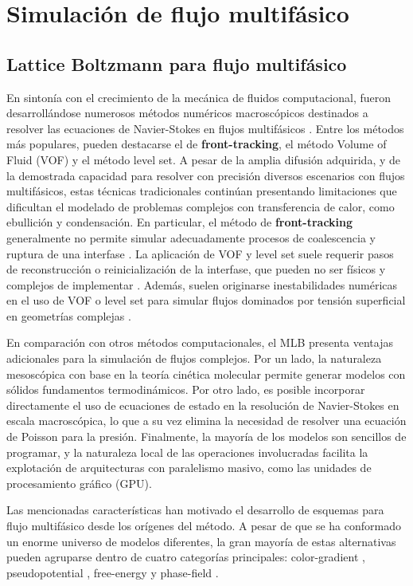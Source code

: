 \chapter{Simulaci\'on de flujo multif\'asico}

\section{Lattice Boltzmann para flujo multif\'asico}
En sinton\'ia con el crecimiento de la mec\'anica de fluidos computacional, fueron desarroll\'andose numerosos m\'etodos num\'ericos macrosc\'opicos destinados a resolver las ecuaciones de Navier-Stokes en flujos multif\'asicos \cite{scardovelli_direct_1999}. Entre los m\'etodos m\'as populares, pueden destacarse el de \textbf{front-tracking}, el m\'etodo Volume of Fluid (VOF) y el m\'etodo level set. A pesar de la amplia difusi\'on adquirida, y de la demostrada capacidad para resolver con precisi\'on diversos escenarios con flujos multif\'asicos, estas t\'ecnicas tradicionales contin\'uan presentando limitaciones que dificultan el modelado de problemas complejos con transferencia de calor, como ebullici\'on y condensaci\'on. En particular, el m\'etodo de \textbf{front-tracking} generalmente no permite simular adecuadamente procesos de coalescencia y ruptura de una interfase \cite{scardovelli_direct_1999,liu_three-dimensional_2012}. La aplicaci\'on de VOF y level set suele requerir pasos de reconstrucci\'on o reinicializaci\'on de la interfase, que pueden no ser f\'isicos y complejos de implementar \cite{liu_three-dimensional_2012}. Adem\'as, suelen originarse inestabilidades num\'ericas en el uso de VOF o level set para simular flujos dominados por tensi\'on superficial en geometr\'ias complejas \cite{scardovelli_direct_1999}.
\par
En comparaci\'on con otros m\'etodos computacionales, el MLB presenta ventajas adicionales para la simulaci\'on de flujos complejos. Por un lado, la naturaleza mesosc\'opica con base en la teor\'ia cin\'etica molecular permite generar modelos con s\'olidos fundamentos termodin\'amicos. Por otro lado, es posible incorporar directamente el uso de ecuaciones de estado en la resoluci\'on de Navier-Stokes en escala macrosc\'opica, lo que a su vez elimina la necesidad de resolver una ecuaci\'on de Poisson para la presi\'on. Finalmente, la mayor\'ia de los modelos son sencillos de programar, y la naturaleza local de las operaciones involucradas facilita la explotaci\'on de arquitecturas con paralelismo masivo, como las unidades de procesamiento gr\'afico (GPU).
\par 
Las mencionadas caracter\'isticas han motivado el desarrollo de esquemas para flujo multif\'asico desde los or\'igenes del m\'etodo. A pesar de que se ha conformado un enorme universo de modelos diferentes, la gran mayor\'ia de estas alternativas pueden agruparse dentro de cuatro categor\'ias principales: color-gradient \cite{liu_three-dimensional_2012,gunstensen_lattice_1991}, pseudopotential \cite{shan_lattice_1993,shan_simulation_1994,chen_critical_2014}, free-energy \cite{swift_lattice_1996,inamuro_galilean_2000} y phase-field \cite{he_lattice_1999,liang_phase-field-based_2014}. 

